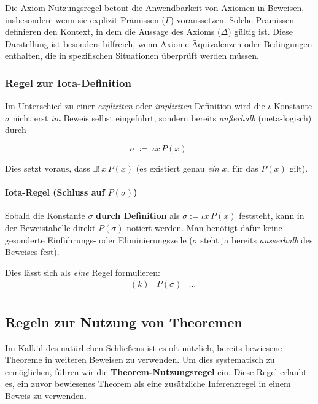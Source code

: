 \documentclass[main.tex]{subfiles}
\begin{document}
\begin{remark}
Die Axiom-Nutzungsregel betont die Anwendbarkeit von Axiomen in Beweisen, insbesondere wenn sie explizit Prämissen (\(\Gamma\)) voraussetzen. Solche Prämissen definieren den Kontext, in dem die Aussage des Axioms (\(\Delta\)) gültig ist. Diese Darstellung ist besonders hilfreich, wenn Axiome Äquivalenzen oder Bedingungen enthalten, die in spezifischen Situationen überprüft werden müssen.
\end{remark}


\subsubsection{Regel zur Iota-Definition}

Im Unterschied zu einer \emph{expliziten} oder \emph{impliziten} Definition wird die \(\iota\)-Konstante \(\sigma\) nicht erst \emph{im} Beweis selbst eingeführt, sondern bereits \emph{außerhalb} (meta-logisch) durch
\begin{definition}[\(\sigma\)]
\label{dfSigmaGenIota}
\[
\sigma \;\coloneqq\; \iota x \, P(x).
\]
\end{definition}
Dies setzt voraus, dass \(\exists!\,x\,P(x)\) (es existiert genau \emph{ein} \(x\), für das \(P(x)\) gilt). 

\paragraph{Iota-Regel (Schluss auf \(P(\sigma)\))}
Sobald die Konstante \(\sigma\) \textbf{durch Definition} als \(\sigma := \iota x \, P(x)\) feststeht, kann in der Beweistabelle direkt \(P(\sigma)\) notiert werden. Man benötigt dafür keine gesonderte Einführungs- oder Eliminierungszeile (\(\sigma\) steht ja bereits \emph{ausserhalb} des Beweises fest). 

Dies lässt sich als \emph{eine} Regel formulieren:
\[
\begin{array}{llll}
   & (k) & P(\sigma) & ... \\
\end{array}
\]



\subsection{Regeln zur Nutzung von Theoremen}
\label{rule:TheoremUsage}

Im Kalkül des natürlichen Schließens ist es oft nützlich, bereits bewiesene Theoreme in weiteren Beweisen zu verwenden. Um dies systematisch zu ermöglichen, führen wir die \textbf{Theorem-Nutzungsregel} ein. Diese Regel erlaubt es, ein zuvor bewiesenes Theorem als eine zusätzliche Inferenzregel in einem Beweis zu verwenden.
\end{document}

